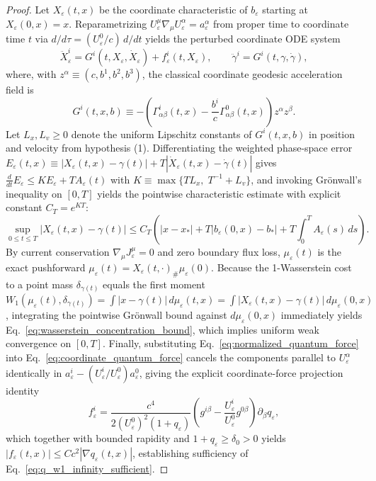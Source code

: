 \documentclass[11pt, a4paper]{article}
\theoremstyle{definition}
\begin{document}
\begin{proof}
Let $X_\varepsilon(t, x)$ be the coordinate characteristic of $b_\varepsilon$ starting at $X_\varepsilon(0, x) = x$. Reparametrizing $U_\varepsilon^\mu \nabla_\mu U_\varepsilon^\alpha = a_\varepsilon^\alpha$ from proper time to coordinate time $t$ via $d/d\tau = (U_\varepsilon^0 / c)\,d/dt$ yields the perturbed coordinate ODE system
\begin{equation}
\ddot{X}_\varepsilon^i = G^i(t, X_\varepsilon, \dot{X}_\varepsilon) + f_\varepsilon^i(t, X_\varepsilon), \qquad \ddot{\gamma}^i = G^i(t, \gamma, \dot{\gamma}),
\end{equation}
where, with $z^\alpha \equiv (c, b^1, b^2, b^3)$, the classical coordinate geodesic acceleration field is
\begin{equation}
G^i(t, x, b) \equiv -\left( \Gamma^i_{\alpha\beta}(t, x) - \frac{b^i}{c}\Gamma^0_{\alpha\beta}(t, x) \right) z^\alpha z^\beta.
\end{equation}
Let $L_x, L_v \ge 0$ denote the uniform Lipschitz constants of $G^i(t, x, b)$ in position and velocity from hypothesis (1). Differentiating the weighted phase-space error $E_\varepsilon(t, x) \equiv |X_\varepsilon(t, x) - \gamma(t)| + T|\dot{X}_\varepsilon(t, x) - \dot{\gamma}(t)|$ gives $\frac{d}{dt}E_\varepsilon \le K E_\varepsilon + T A_\varepsilon(t)$ with $K \equiv \max\{T L_x,\; T^{-1} + L_v\}$, and invoking Gr\"{o}nwall's inequality on $[0, T]$ yields the pointwise characteristic estimate with explicit constant $C_T = e^{KT}$:
\begin{equation}
\sup_{0 \le t \le T} |X_\varepsilon(t, x) - \gamma(t)| \le C_T \left( |x - x_*| + T|b_\varepsilon(0, x) - b_*| + T\int_0^T A_\varepsilon(s)\,ds \right).
\end{equation}
By current conservation $\nabla_\mu J_\varepsilon^\mu = 0$ and zero boundary flux loss, $\mu_\varepsilon(t)$ is the exact pushforward $\mu_\varepsilon(t) = X_\varepsilon(t, \cdot)_\# \mu_\varepsilon(0)$. Because the 1-Wasserstein cost to a point mass $\delta_{\gamma(t)}$ equals the first moment $W_1(\mu_\varepsilon(t), \delta_{\gamma(t)}) = \int |x - \gamma(t)|\,d\mu_\varepsilon(t, x) = \int |X_\varepsilon(t, x) - \gamma(t)|\,d\mu_\varepsilon(0, x)$, integrating the pointwise Gr\"{o}nwall bound against $d\mu_\varepsilon(0, x)$ immediately yields Eq.~\eqref{eq:wasserstein_concentration_bound}, which implies uniform weak convergence on $[0, T]$. Finally, substituting Eq.~\eqref{eq:normalized_quantum_force} into Eq.~\eqref{eq:coordinate_quantum_force} cancels the components parallel to $U_\varepsilon^\alpha$ identically in $a_\varepsilon^i - (U_\varepsilon^i / U_\varepsilon^0)a_\varepsilon^0$, giving the explicit coordinate-force projection identity
\[
f_\varepsilon^i = \frac{c^4}{2(U_\varepsilon^0)^2(1 + q_\varepsilon)}\left( g^{i\beta} - \frac{U_\varepsilon^i}{U_\varepsilon^0} g^{0\beta} \right) \partial_\beta q_\varepsilon,
\]
which together with bounded rapidity and $1 + q_\varepsilon \ge \delta_0 > 0$ yields $|f_\varepsilon(t, x)| \le C c^2 |\nabla q_\varepsilon(t, x)|$, establishing sufficiency of Eq.~\eqref{eq:q_w1_infinity_sufficient}.
\end{proof}
\end{document}

